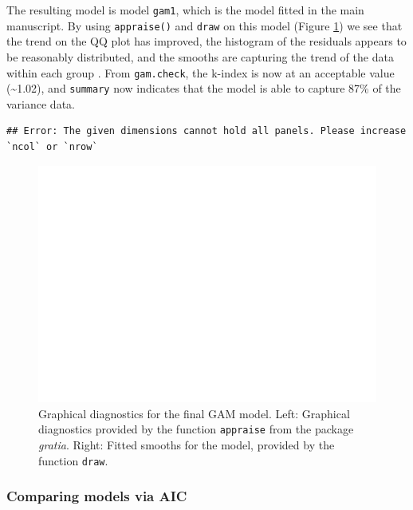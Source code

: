 \documentclass[
]{article}
\newcommand{\passthrough}[1]{#1}
\begin{document}
The resulting model is model \passthrough{\lstinline!gam1!}, which is the model fitted in the main manuscript. By using \passthrough{\lstinline!appraise()!} and \passthrough{\lstinline!draw!} on this model (Figure \ref{fig:final-GAM-diag}) we see that the trend on the QQ plot has improved, the histogram of the residuals appears to be reasonably distributed, and the smooths are capturing the trend of the data within each group . From \passthrough{\lstinline!gam.check!}, the k-index is now at an acceptable value (\textasciitilde1.02), and \passthrough{\lstinline!summary!} now indicates that the model is able to capture 87\% of the variance data.



\begin{lstlisting}
## Error: The given dimensions cannot hold all panels. Please increase `ncol` or `nrow`
\end{lstlisting}

\begin{figure}[H]

{\centering \includegraphics[width=0.75\linewidth,]{Full_document_files/figure-latex/final-GAM-diag-1} 

}

\caption{Graphical diagnostics for the final GAM model. Left: Graphical diagnostics provided by the function \passthrough{\lstinline!appraise!} from the package \emph{gratia}. Right: Fitted smooths for the model, provided by the function \passthrough{\lstinline!draw!}.}\label{fig:final-GAM-diag}
\end{figure}

\hypertarget{comparing-models-via-aic}{%
\subsubsection{Comparing models via AIC}\label{comparing-models-via-aic}}
\end{document}
